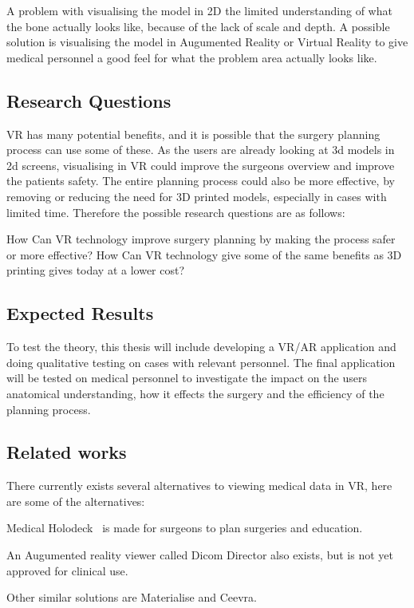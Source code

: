 \documentclass[11pt]{scrartcl}
\begin{document}
A problem with visualising the model in 2D the limited understanding of what
the bone actually looks like, because of the lack of scale and depth. A
possible solution is visualising the model in Augumented Reality or Virtual
Reality to give medical personnel a good feel for what the problem area actually looks like.

\subsection{Research Questions}
VR has many potential benefits, and it is possible that the surgery planning
process can use some of these. As the users are already looking at 3d models in
2d screens, visualising in VR could improve the surgeons overview and improve the patients safety. The entire planning process could also be more effective, by removing or reducing the need for 3D printed models, especially in cases with limited time. Therefore the possible research questions are as follows:

How Can VR technology improve surgery planning by making the process safer or more effective?
How Can VR technology give some of the same benefits as 3D printing gives today at a lower cost?


\subsection{Expected Results}
To test the theory, this thesis will include developing a VR/AR application and
doing qualitative testing on cases with relevant personnel.
The final application will be tested on medical personnel to investigate the impact on the users anatomical understanding, how it effects the surgery and the efficiency of the planning process.

\subsection{Related works}

There currently exists several alternatives to viewing medical data in VR, here are some of the alternatives:

Medical Holodeck~\cite{medical_holodeck_medicalholodeck_nodate} is made for surgeons to plan surgeries and education.

An Augumented reality viewer called Dicom Director also exists, but is not yet approved for clinical use.\cite{dicomdirectorcom_surgeons_nodate}

Other similar solutions are Materialise\cite{materialise_medical_nodate} and
Ceevra\cite{ceevra_inc_using_2019}.
\end{document}
